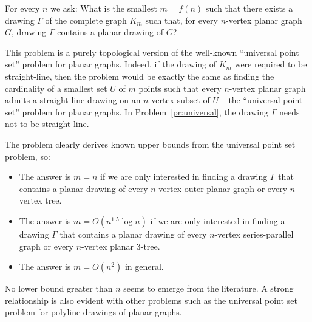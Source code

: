 \documentclass{patmorin}
\begin{document}
\begin{op} \label{pr:universal}
For every $n$ we ask: What is the smallest $m=f(n)$ such that there exists a drawing $\Gamma$ of the complete graph $K_m$ such that, for every $n$-vertex planar graph $G$, drawing $\Gamma$ contains a planar drawing of $G$?
\end{op} 

This problem is a purely topological version of the well-known ``universal point set'' problem for planar graphs. Indeed, if the drawing of $K_m$ were required to be straight-line, then the problem would be exactly the same as finding the cardinality of a smallest set $U$ of $m$ points such that every $n$-vertex planar graph admits a straight-line drawing on an $n$-vertex subset of $U$ -- the ``universal point set'' problem for planar graphs. In Problem~\ref{pr:universal}, the drawing $\Gamma$ needs not to be straight-line.

The problem clearly derives known upper bounds from the universal point set problem, so:

\begin{itemize}
\item The answer is $m=n$ if we are only interested in finding a drawing $\Gamma$ that contains a planar drawing of every $n$-vertex outer-planar graph or every $n$-vertex tree.
\item The answer is $m=O(n^{1.5}\log n)$ if we are only interested in finding a drawing $\Gamma$ that contains a planar drawing of every $n$-vertex series-parallel graph or every $n$-vertex planar $3$-tree.
\item The answer is $m=O(n^2)$ in general.
\end{itemize}

No lower bound greater than $n$ seems to emerge from the literature. A strong relationship is also evident with other problems such as the universal point set problem for polyline drawings of planar graphs.
\end{document}
